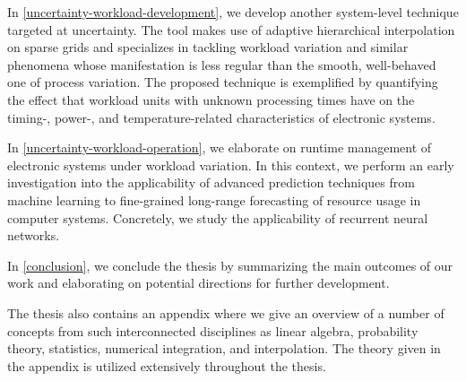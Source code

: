 In \cref{uncertainty-workload-development}, we develop another system-level
technique targeted at uncertainty. The tool makes use of adaptive hierarchical
interpolation on sparse grids and specializes in tackling workload variation and
similar phenomena whose manifestation is less regular than the smooth,
well-behaved one of process variation. The proposed technique is exemplified by
quantifying the effect that workload units with unknown processing times have on
the timing-, power-, and temperature-related characteristics of electronic
systems.

In \cref{uncertainty-workload-operation}, we elaborate on runtime management of
electronic systems under workload variation. In this context, we perform an
early investigation into the applicability of advanced prediction techniques
from machine learning to fine-grained long-range forecasting of resource usage
in computer systems. Concretely, we study the applicability of recurrent neural
networks.

In \cref{conclusion}, we conclude the thesis by summarizing the main outcomes of
our work and elaborating on potential directions for further development.

The thesis also contains an appendix where we give an overview of a number of
concepts from such interconnected disciplines as linear algebra, probability
theory, statistics, numerical integration, and interpolation. The theory given
in the appendix is utilized extensively throughout the thesis.
